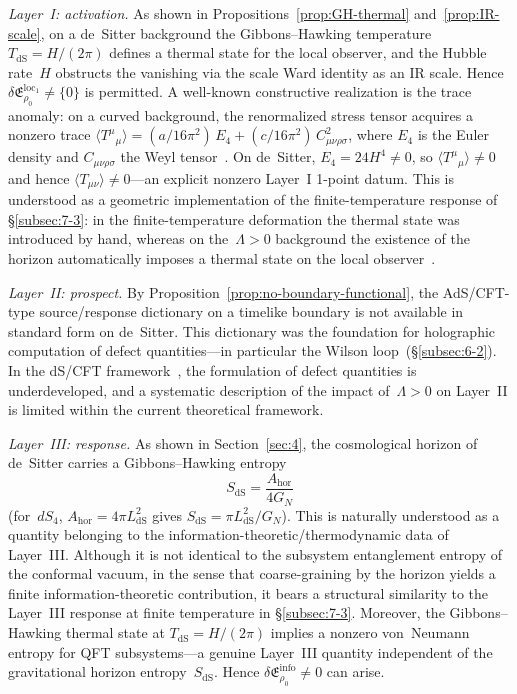 \documentclass[
  aps,
  prd,
  preprint,
  groupedaddress,
  nofootinbib,
  longbibliography
]{revtex4-2}
\theoremstyle{remark}
\newcommand{\dS}{\mathrm{dS}}
\begin{document}
\emph{Layer~I: activation.}
As shown in Propositions~\ref{prop:GH-thermal}
and~\ref{prop:IR-scale}, on a de~Sitter background the
Gibbons--Hawking temperature
$T_{\dS}=H/(2\pi)$ defines a thermal state for the local
observer, and the Hubble rate~$H$ obstructs the vanishing via the
scale Ward identity as an IR scale.
Hence
$\delta\mathfrak{E}_{\rho_0}^{\mathrm{loc}_1}\neq\{0\}$
is permitted.
A well-known constructive realization is the trace anomaly:
on a curved background, the renormalized stress tensor acquires
a nonzero trace
$\langle T^\mu{}_\mu\rangle
  = (a/16\pi^2)\,E_4 + (c/16\pi^2)\,C_{\mu\nu\rho\sigma}^2$,
where $E_4$ is the Euler density and
$C_{\mu\nu\rho\sigma}$ the Weyl tensor~\cite{ref23}.
On de~Sitter, $E_4 = 24 H^4\neq 0$, so
$\langle T^\mu{}_\mu\rangle\neq 0$ and hence
$\langle T_{\mu\nu}\rangle\neq 0$---an explicit nonzero
Layer~I 1-point datum.
This is understood as a geometric implementation of the finite-temperature response of \S\ref{subsec:7-3}: in the
finite-temperature deformation the thermal state was introduced
by hand, whereas on the~$\Lambda>0$ background the existence of
the horizon automatically imposes a thermal state on the local
observer~\cite{ref15}.

\emph{Layer~II: prospect.}
By Proposition~\ref{prop:no-boundary-functional}, the
AdS/CFT-type source/response dictionary on a timelike boundary
is not available in standard form on de~Sitter.
This dictionary was the foundation for holographic computation
of defect quantities---in particular the Wilson
loop~(\S\ref{subsec:6-2}).
In the dS/CFT framework~\cite{ref18}, the formulation of defect
quantities is underdeveloped, and a systematic description of
the impact of~$\Lambda>0$ on Layer~II is limited within the
current theoretical framework.

\emph{Layer~III: response.}
As shown in Section~\ref{sec:4}, the cosmological horizon of
de~Sitter carries a Gibbons--Hawking entropy
\begin{equation}\label{eq:dS-entropy}
  S_{\dS} = \frac{A_{\mathrm{hor}}}{4G_N}
\end{equation}
\cite{ref15}
(for~$dS_4$, $A_{\mathrm{hor}}=4\pi L_{\dS}^2$ gives
$S_{\dS}=\pi L_{\dS}^2/G_N$).
This is naturally understood as a quantity belonging to the
information-theoretic/thermodynamic data of Layer~III\@.
Although it is not identical to the subsystem entanglement
entropy of the conformal vacuum, in the sense that
coarse-graining by the horizon yields a finite
information-theoretic contribution, it bears a structural
similarity to the Layer~III response at finite temperature
in \S\ref{subsec:7-3}.
Moreover, the Gibbons--Hawking thermal state at
$T_{\dS}=H/(2\pi)$ implies a nonzero von~Neumann entropy for
QFT subsystems---a genuine Layer~III quantity independent of
the gravitational horizon entropy~$S_{\dS}$.
Hence
$\delta\mathfrak{E}_{\rho_0}^{\mathrm{info}}\neq 0$
can arise.
\end{document}
